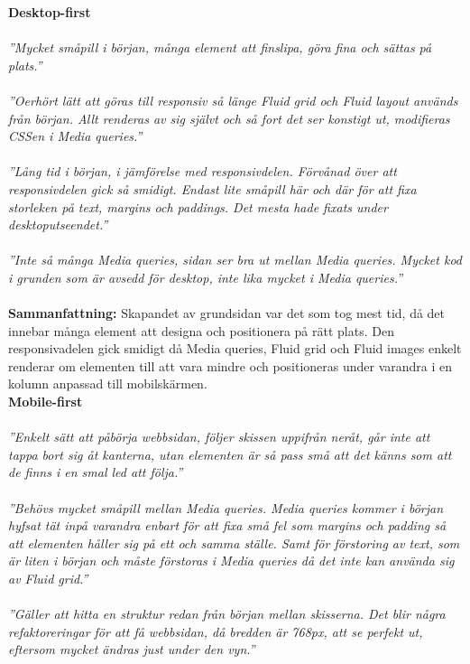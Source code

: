 \documentclass[11pt]{article}
\begin{document}
\textbf{Desktop-first}
\\\\
\textit{”Mycket småpill i början, många element att finslipa, göra fina och sättas på plats.”}\\\\
\textit{”Oerhört lätt att göras till responsiv så länge Fluid grid och Fluid layout används från början. Allt renderas av sig självt och så fort det ser konstigt ut, modifieras CSSen i Media queries.”}\\\\
\textit{”Lång tid i början, i jämförelse med responsivdelen. Förvånad över att responsivdelen gick så smidigt. Endast lite småpill här och där för att fixa storleken på text, margins och paddings. Det mesta hade fixats under desktoputseendet.”}\\\\
\textit{”Inte så många Media queries, sidan ser bra ut mellan Media queries. Mycket kod i grunden som är avsedd för desktop, inte lika mycket i Media queries.”}\\\\
\textbf{Sammanfattning:} Skapandet av grundsidan var det som tog mest tid, då det innebar många element att designa och positionera på rätt plats. Den responsivadelen gick smidigt då Media queries, Fluid grid och Fluid images enkelt renderar om elementen till att vara mindre och positioneras under varandra i en kolumn anpassad till mobilskärmen.
\vspace{0.735cm}
\\
\textbf{Mobile-first}
\\\\
\textit{”Enkelt sätt att påbörja webbsidan, följer skissen uppifrån neråt, går inte att tappa bort sig åt kanterna, utan elementen är så pass små att det känns som att de finns i en smal led att följa.”}\\\\
\textit{”Behövs mycket småpill mellan Media queries. Media queries kommer i början hyfsat tät inpå varandra enbart för att fixa små fel som margins och padding så att elementen håller sig på ett och samma ställe. Samt för förstoring av text, som är liten i början och måste förstoras i Media queries då det inte kan använda sig av Fluid grid.”}\\\\
\textit{”Gäller att hitta en struktur redan från början mellan skisserna. Det blir några refaktoreringar för att få webbsidan, då bredden är 768px, att se perfekt ut, eftersom mycket ändras just under den vyn.”}\\\\
\end{document}
